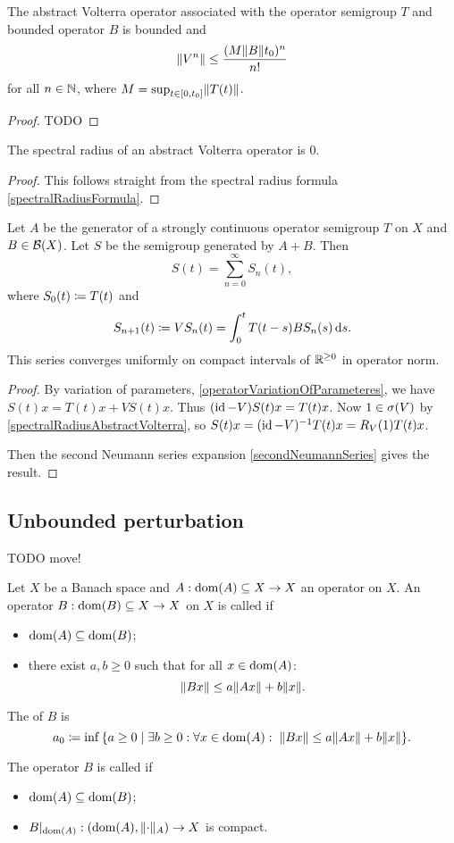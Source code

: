 \begin{lemma}
The abstract Volterra operator associated with the operator semigroup $T$ and bounded operator $B$ is bounded and
\[ \lVert V^n\rVert \leq \frac{(M\lVert B\rVert t_0)^n}{n!} \]
for all $n\in \mathbb{N}$, where $M = \sup_{t\in\interval{0,t_0}}\norm{T(t)}$.
\end{lemma}
\begin{proof}
TODO
\end{proof}
\begin{corollary} \label{spectralRadiusAbstractVolterra}
The spectral radius of an abstract Volterra operator is $0$.
\end{corollary}
\begin{proof}
This follows straight from the spectral radius formula \ref{spectralRadiusFormula}.
\end{proof}

\begin{theorem}
Let $A$ be the generator of a strongly continuous operator semigroup $T$ on $X$ and $B\in\operatorname{\mathcal{B}}(X)$. Let $S$ be the semigroup generated by $A+B$. Then
\[ S(t) = \sum_{n=0}^\infty S_n(t), \]
where $S_0(t) \coloneqq T(t)$ and
\[ S_{n+1}(t) \coloneqq VS_n(t) = \int_0^tT(t-s)BS_n(s)\operatorname{d \!}{s}. \]
This series converges uniformly on compact intervals of $\mathbb{R}^{\geq 0}$ in operator norm.
\end{theorem}
\begin{proof}
By variation of parameters, \ref{operatorVariationOfParameteres}, we have $S(t)x = T(t)x + VS(t)x$. Thus $(\operatorname{id} - V)S(t)x = T(t)x$. Now $1\in\sigma(V)$ by \ref{spectralRadiusAbstractVolterra}, so $S(t)x = (\operatorname{id} - V)^{-1}T(t)x = R_V(1)T(t)x$. 

Then the second Neumann series expansion \ref{secondNeumannSeries} gives the result.
\end{proof}

\subsection{Unbounded perturbation}
TODO move!

\begin{definition}
Let $X$ be a Banach space and $A: \operatorname{dom}(A)\subseteq X\to X$ an operator on $X$. An operator $B: \operatorname{dom}(B)\subseteq X\to X$ on $X$ is called  if
\begin{itemize}
\item $\operatorname{dom}(A) \subseteq \operatorname{dom}(B)$;
\item there exist $a,b\geq 0$ such that for all $x\in \operatorname{dom}(A)$:
\[ \lVert Bx\rVert \leq a\lVert Ax\rVert + b\lVert x\rVert. \]
\end{itemize}
The  of $B$ is
\[ a_0 \defeq \inf\setbuilder{a\geq 0}{\exists b\geq 0: \forall x\in\dom(A): \;\norm{Bx} \leq a\norm{Ax} + b\norm{x}}. \]

The operator $B$ is called  if
\begin{itemize}
\item $\operatorname{dom}(A) \subseteq \operatorname{dom}(B)$;
\item $B|_{\dom(A)}: \sSet{\dom(A), \norm{\cdot}_A} \to X$ is compact.
\end{itemize}
\end{definition}

